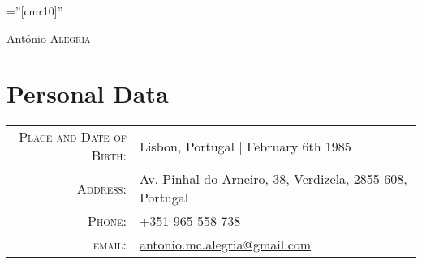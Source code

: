 \documentclass[a4paper,10pt]{article}
\begin{document}
  \pagestyle{empty} %

  \font\fb=''[cmr10]'' %

  \par{\centering
  {\Huge António \textsc{Alegria} %
  }\bigskip\par}

  \section{Personal Data}

  \begin{tabular}{rl}
    \textsc{Place and Date of Birth:} & Lisbon, Portugal  | February 6th 1985                                   \\
    \textsc{Address:}                 & Av. Pinhal do Arneiro, 38, Verdizela, 2855-608, Portugal                \\
    \textsc{Phone:}                   & +351 965 558 738                                                        \\
    \textsc{email:}                   & \href{mailto:antonio.mc.alegria@gmail.com}{antonio.mc.alegria@gmail.com}
  \end{tabular}

\end{document}
